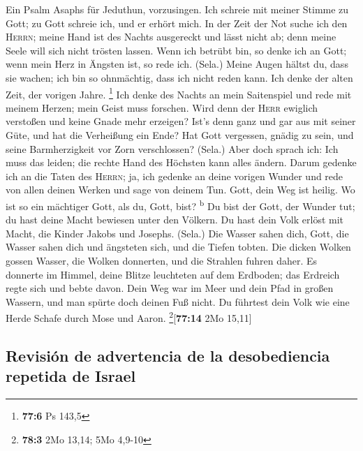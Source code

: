  Ein Psalm Asaphs für Jeduthun, vorzusingen.
 Ich schreie mit meiner Stimme zu Gott; zu Gott schreie
ich, und er erhört mich.  In der Zeit der Not suche ich
den \textsc{Herrn}; meine Hand ist des Nachts ausgereckt und lässt nicht
ab; denn meine Seele will sich nicht trösten lassen.  Wenn
ich betrübt bin, so denke ich an Gott; wenn mein Herz in Ängsten ist, so
rede ich. (Sela.)  Meine Augen hältst du, dass sie wachen;
ich bin so ohnmächtig, dass ich nicht reden kann.  Ich
denke der alten Zeit, der vorigen Jahre. \footnote{\textbf{77:6} Ps
  143,5}  Ich denke des Nachts an mein Saitenspiel und
rede mit meinem Herzen; mein Geist muss forschen.  Wird
denn der \textsc{Herr} ewiglich verstoßen und keine Gnade mehr erzeigen?
 Ist's denn ganz und gar aus mit seiner Güte, und hat die
Verheißung ein Ende?  Hat Gott vergessen, gnädig zu sein,
und seine Barmherzigkeit vor Zorn verschlossen? (Sela.) 
Aber doch sprach ich: Ich muss das leiden; die rechte Hand des Höchsten
kann alles ändern.  Darum gedenke ich an die Taten des
\textsc{Herrn}; ja, ich gedenke an deine vorigen Wunder 
und rede von allen deinen Werken und sage von deinem Tun.
 Gott, dein Weg ist heilig. Wo ist so ein mächtiger Gott,
als du, Gott, bist? \textsuperscript{b}  Du bist der
Gott, der Wunder tut; du hast deine Macht bewiesen unter den Völkern.
 Du hast dein Volk erlöst mit Macht, die Kinder Jakobs
und Josephs. (Sela.)  Die Wasser sahen dich, Gott, die
Wasser sahen dich und ängsteten sich, und die Tiefen tobten.
 Die dicken Wolken gossen Wasser, die Wolken donnerten,
und die Strahlen fuhren daher.  Es donnerte im Himmel,
deine Blitze leuchteten auf dem Erdboden; das Erdreich regte sich und
bebte davon.  Dein Weg war im Meer und dein Pfad in
großen Wassern, und man spürte doch deinen Fuß nicht.  Du
führtest dein Volk wie eine Herde Schafe durch Mose und Aaron.
\footnote{\textbf{78:3} 2Mo 13,14; 5Mo 4,9-10}{[}\textbf{77:14} 2Mo
15,11{]}

\hypertarget{revisiuxf3n-de-advertencia-de-la-desobediencia-repetida-de-israel}{%
\subsection{Revisión de advertencia de la desobediencia repetida de
Israel}\label{revisiuxf3n-de-advertencia-de-la-desobediencia-repetida-de-israel}}


